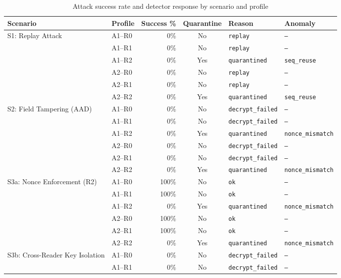 \begin{table}[htbp]
\centering
\caption{Attack success rate and detector response by scenario and profile}
\label{tab:scenario-summary}
\small
\begin{tabular}{l l r c l l}
\toprule
Scenario & Profile & Success \% & Quarantine & Reason & Anomaly \\
\midrule
  S1: Replay Attack & A1--R0 & 0\% & No & \texttt{replay} & \texttt{--} \\
   & A1--R1 & 0\% & No & \texttt{replay} & \texttt{--} \\
   & A1--R2 & 0\% & Yes & \texttt{quarantined} & \texttt{seq\_reuse} \\
   & A2--R0 & 0\% & No & \texttt{replay} & \texttt{--} \\
   & A2--R1 & 0\% & No & \texttt{replay} & \texttt{--} \\
   & A2--R2 & 0\% & Yes & \texttt{quarantined} & \texttt{seq\_reuse} \\
\midrule
  S2: Field Tampering (AAD) & A1--R0 & 0\% & No & \texttt{decrypt\_failed} & \texttt{--} \\
   & A1--R1 & 0\% & No & \texttt{decrypt\_failed} & \texttt{--} \\
   & A1--R2 & 0\% & Yes & \texttt{quarantined} & \texttt{nonce\_mismatch} \\
   & A2--R0 & 0\% & No & \texttt{decrypt\_failed} & \texttt{--} \\
   & A2--R1 & 0\% & No & \texttt{decrypt\_failed} & \texttt{--} \\
   & A2--R2 & 0\% & Yes & \texttt{quarantined} & \texttt{nonce\_mismatch} \\
\midrule
  S3a: Nonce Enforcement (R2) & A1--R0 & 100\% & No & \texttt{ok} & \texttt{--} \\
   & A1--R1 & 100\% & No & \texttt{ok} & \texttt{--} \\
   & A1--R2 & 0\% & Yes & \texttt{quarantined} & \texttt{nonce\_mismatch} \\
   & A2--R0 & 100\% & No & \texttt{ok} & \texttt{--} \\
   & A2--R1 & 100\% & No & \texttt{ok} & \texttt{--} \\
   & A2--R2 & 0\% & Yes & \texttt{quarantined} & \texttt{nonce\_mismatch} \\
\midrule
  S3b: Cross-Reader Key Isolation & A1--R0 & 0\% & No & \texttt{decrypt\_failed} & \texttt{--} \\
   & A1--R1 & 0\% & No & \texttt{decrypt\_failed} & \texttt{--} \\

\end{tabular}
\end{table}
